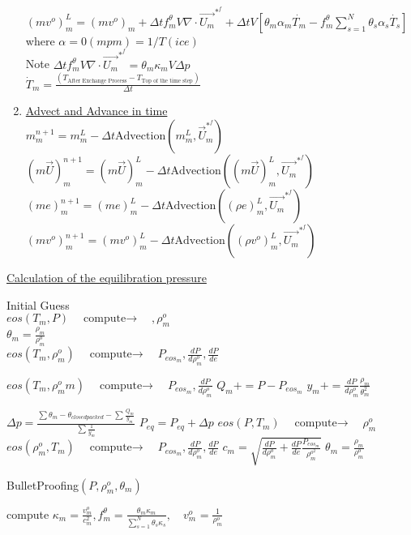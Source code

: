\documentclass[fleqn]{article}
\newcommand{\SUM}[1]    {\ensuremath{\sum \limits_{{#1}=1}^N }}
\newcommand{\U}         {{\vec{U}}}
\newcommand{\rhoM}      {\ensuremath{\rho^{o}_m}}
\newcommand{\delt}      {\ensuremath{\Delta{t}} }
\newcommand{\f}         {\ensuremath{f^{\theta}_m} }
\newcommand{\sv}[1]     {\ensuremath{v^o_{m_{#1}} }}
\newcommand{\dpdrho}    {\ensuremath{ \frac{dP}{d\rhoM}} }
\newcommand{\compute}   {\ensuremath{\quad{\text{compute}\rightarrow}\quad}}
\begin{document}
\begin{enumerate}
\\
    $(mv^o)^L_m = (mv^o)_m + \delt \f V \nabla \cdot  \vec{U_m}^{*^{f}}
                + \delt V [\theta_m \alpha_m \dot{T_m} 
                - \f \SUM{s} {\theta_s \alpha_s \dot{T_s}}]  $ \quad where $\alpha = 0 (mpm) = 1/T (ice)$  \\
    Note $\delt \f V \nabla \cdot  \vec{U_m}^{*^{f}} = \theta_m \kappa_m V \Delta{p}$\\
   $\dot T_m =\frac{ (T_{\text{After Exchange Process}} - T_{\text{Top of the time step}})}{\delt} $
\item \underline{Advect and Advance in time}\\
$
    m^{n+1}_m     = m^L_m 
                  - \delt\text{Advection}(m^L_m, \U_ m^{*^{f}})$\\
$
    (m \U)^{n+1}_m = (m \U)^L_m 
                   - \delt\text{Advection}((m \U)^L_m, \vec{U_m}^{*^{f}})$\\
$
    (me)^{n+1}_m   = (me)^L_m       
                   - \delt\text{Advection}((\rho  e)^L_m, \vec{U_m}^{*^{f}})$ \\
$
    (mv^o)^{n+1}_m   = (mv^o)^L_m       
                   - \delt\text{Advection}((\rho  v^o)^L_m, \vec{U_m}^{*^{f}})
$

\end{enumerate}
\newpage
\underline{Calculation of the equilibration pressure}

\begin{algorithmic}
\STATE Initial Guess \\
  $eos(T_m, P)  \compute ,\rhoM$ \\
  $\theta_m = \frac{\rho_m}{\rhoM}$  \\
  $eos(T_m, \rhoM)  \compute P_{{eos}_m}, \dpdrho, \frac{dP}{de}$ 
%
    
      \STATE  $eos(T_m,\rhoM{m})  \compute P_{eos_{m}}, \dpdrho$
      \STATE $Q_m += P- P_{{eos}_m}$
      \STATE $y_m  += \dpdrho \frac{\rho_m}{\theta_m^2}$
    \ENDFOR

    \STATE $\Delta p = \frac{  \sum{\theta_m} - \theta_{closedpacked} - \sum{\frac{Q_m}{y_m}}  }{\sum{\frac{1}{y_m}} } $
    \STATE $P_{eq}=P_{eq}+ \Delta p $
%
      \STATE $ eos(P, T_m) \compute  \rhoM$ 
      \STATE $ eos(\rhoM, T_m) \compute   P_{{eos}_m}, \dpdrho, \frac{dP}{de}$ 
      \STATE $c_m = \sqrt{ \dpdrho + \frac{dP}{de}  \frac{P_{{eos}_m }}{\rho^{o^2}_m} }$
      \STATE $ \theta_m =  \frac{\rho_m}{\rhoM}$
    \ENDFOR

\ENDWHILE 
\STATE BulletProofing$(P, \rhoM, \theta_m) $

\STATE compute $ \kappa_m = \frac{v^o_m}{c^2_m}, \f = \frac{\theta_m \kappa_m}{\SUM{s}{\theta_s \kappa_s}},  \quad\sv{} = \frac {1}{\rhoM}$
\end{algorithmic}
\end{document}
